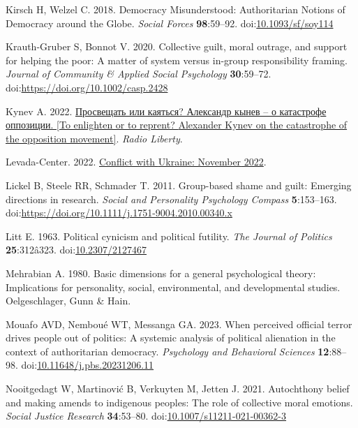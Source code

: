 \documentclass[
]{article}
\newlength{\cslhangindent}
\newenvironment{CSLReferences}[2] %
 {\begin{list}{}{%
  \setlength{\itemindent}{0pt}
  \setlength{\leftmargin}{0pt}
  \setlength{\parsep}{0pt}
  \ifodd #1
   \setlength{\leftmargin}{\cslhangindent}
   \setlength{\itemindent}{-1\cslhangindent}
  \fi
  \setlength{\itemsep}{#2\baselineskip}}}
 {\end{list}}
\begin{document}
\begin{CSLReferences}{1}{0}
Kirsch H, Welzel C. 2018. {Democracy Misunderstood: Authoritarian Notions of Democracy around the Globe}. \emph{Social Forces} \textbf{98}:59--92. doi:\href{https://doi.org/10.1093/sf/soy114}{10.1093/sf/soy114}

Krauth-Gruber S, Bonnot V. 2020. Collective guilt, moral outrage, and support for helping the poor: A matter of system versus in-group responsibility framing. \emph{Journal of Community \& Applied Social Psychology} \textbf{30}:59--72. doi:\url{https://doi.org/10.1002/casp.2428}

Kynev A. 2022. \href{https://www.svoboda.org/a/prosveschatj-ili-kayatjsya-aleksandr-kynev-o-katastrofe-oppozitsii/31792631.html}{Просвещать или каяться? Александр кынев -- о катастрофе оппозиции. {[}To enlighten or to reprent? {Alexander Kynev} on the catastrophe of the opposition movement{]}}. \emph{Radio Liberty}.

Levada-Center. 2022. \href{https://www.levada.ru/en/2022/12/12/conflict-with-ukraine-november-2022/}{Conflict with {Ukraine: November} 2022}.

Lickel B, Steele RR, Schmader T. 2011. Group-based shame and guilt: Emerging directions in research. \emph{Social and Personality Psychology Compass} \textbf{5}:153--163. doi:\url{https://doi.org/10.1111/j.1751-9004.2010.00340.x}

Litt E. 1963. Political cynicism and political futility. \emph{The Journal of Politics} \textbf{25}:312â323. doi:\href{https://doi.org/10.2307/2127467}{10.2307/2127467}

Mehrabian A. 1980. Basic dimensions for a general psychological theory: Implications for personality, social, environmental, and developmental studies. Oelgeschlager, Gunn \& Hain.

Mouafo AVD, Nemboué WT, Messanga GA. 2023. When perceived official terror drives people out of politics: A systemic analysis of political alienation in the context of authoritarian democracy. \emph{Psychology and Behavioral Sciences} \textbf{12}:88--98. doi:\href{https://doi.org/10.11648/j.pbs.20231206.11}{10.11648/j.pbs.20231206.11}

Nooitgedagt W, Martinović B, Verkuyten M, Jetten J. 2021. Autochthony belief and making amends to indigenous peoples: The role of collective moral emotions. \emph{Social Justice Research} \textbf{34}:53--80. doi:\href{https://doi.org/10.1007/s11211-021-00362-3}{10.1007/s11211-021-00362-3}


\end{CSLReferences}
\end{document}
